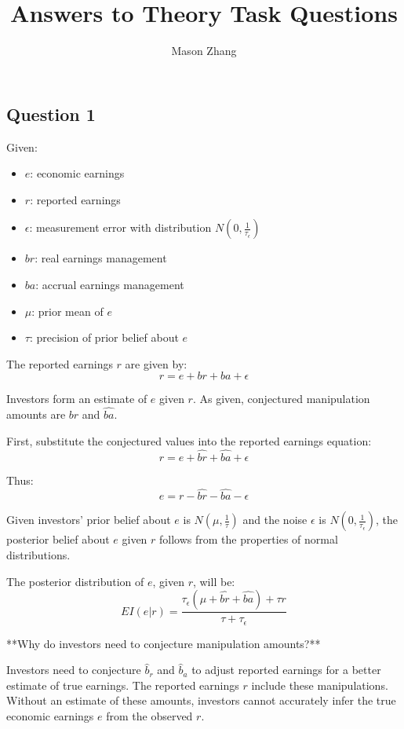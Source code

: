 \documentclass{article}
\title{Answers to Theory Task Questions}
\author{Mason Zhang}
\begin{document}
\maketitle

\subsection*{Question 1}

Given:
\begin{itemize}
    \item \( e \): economic earnings
    \item \( r \): reported earnings
    \item \( \epsilon \): measurement error with distribution \( N(0, \frac{1}{\tau_\epsilon}) \)
    \item \( br \): real earnings management
    \item \( ba \): accrual earnings management
    \item \( \mu \): prior mean of \( e \)
    \item \( \tau \): precision of prior belief about \( e \)
\end{itemize}

The reported earnings \( r \) are given by:
\[
r = e + br + ba + \epsilon
\]

Investors form an estimate of \( e \) given \( r \). As given, conjectured manipulation amounts are \( \hat{br} \) and \( \hat{ba} \).

First, substitute the conjectured values into the reported earnings equation:
\[
r = e + \hat{br} + \hat{ba} + \epsilon
\]

Thus:
\[
e = r - \hat{br} - \hat{ba} - \epsilon
\]

Given investors' prior belief about \( e \) is \( N(\mu, \frac{1}{\tau}) \) and the noise \( \epsilon \) is \( N(0, \frac{1}{\tau_\epsilon}) \), the posterior belief about \( e \) given \( r \) follows from the properties of normal distributions.

The posterior distribution of \( e \), given \( r \), will be:
\[
EI(e|r) = \frac{\tau_\epsilon (\mu + \hat{br} + \hat{ba}) + \tau r}{\tau + \tau_\epsilon}
\]

**Why do investors need to conjecture manipulation amounts?**

Investors need to conjecture \( \hat{b}_r \) and \( \hat{b}_a \) to adjust reported earnings for a better estimate of true earnings. The reported earnings \(r\) include these manipulations. Without an estimate of these amounts, investors cannot accurately infer the true economic earnings \(e\) from the observed \(r\).
\end{document}
